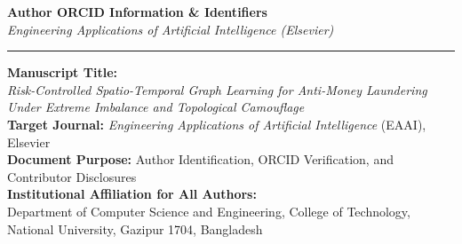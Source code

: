 \documentclass[a4paper,10pt]{article}
\begin{document}
\pagestyle{empty}

\begin{center}
    {\Large \textbf{Author ORCID Information \& Identifiers}}\\[0.8ex]
    {\normalsize \textit{Engineering Applications of Artificial Intelligence (Elsevier)}}\\[0.6ex]
    \rule{\textwidth}{0.8pt}
\end{center}

\vspace{0.8ex}

\noindent\textbf{Manuscript Title:} \\
\textit{Risk-Controlled Spatio-Temporal Graph Learning for Anti-Money Laundering Under Extreme Imbalance and Topological Camouflage}\\[1.0ex]
\textbf{Target Journal:} \textit{Engineering Applications of Artificial Intelligence} (EAAI), Elsevier\\[0.5ex]
\textbf{Document Purpose:} Author Identification, ORCID Verification, and Contributor Disclosures\\[0.5ex]
\textbf{Institutional Affiliation for All Authors:} \\
Department of Computer Science and Engineering, College of Technology,\\
National University, Gazipur 1704, Bangladesh\\[1.5ex]
\end{document}
